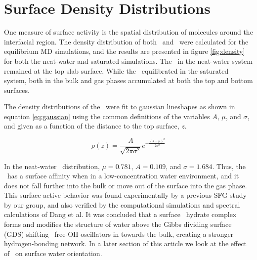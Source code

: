 \section{Surface Density Distributions}

One measure of surface activity is the spatial distribution of molecules around the interfacial region. The density distribution of both \wat~and \suldiox~were calculated for the equilibrium MD simulations, and the results are presented in figure \ref{fig:density} for both the neat-water and saturated simulations. The \suldiox~in the neat-water system remained at the top slab surface. While the \suldiox~equilibrated in the saturated system, both in the bulk and gas phases accumulated at both the top and bottom surfaces. 

The density distributions of the \suldiox~were fit to gaussian lineshapes as shown in equation \ref{eq:gaussian} using the common definitions of the variables $A$, $\mu$, and $\sigma$, and given as a function of the distance to the top surface, $z$.

\begin{equation}
  \rho(z)=\frac{A}{\sqrt{2 \pi \sigma^2}} e^{-\frac{(z-\mu)^2}{2\sigma^2}}
  \label{eq:gaussian}
\end{equation}

In the neat-water \suldiox~distribution, $\mu=0.781$, $A=0.109$, and $\sigma=1.684$\angs. Thus, the \suldiox~has a surface affinity when in a low-concentration water environment, and it does not fall further into the bulk or move out of the surface into the gas phase. This surface active behavior was found experimentally by a previous SFG study by our group,\cite{Tarbuck2005,Tarbuck2006} and also verified by the computational simulations and spectral calculations of Dang et al.\cite{Baer2010} It was concluded that a surface \suldiox~hydrate complex forms and modifies the structure of water above the Gibbs dividing surface (GDS) shifting \wat~free-OH oscillators in towards the bulk, creating a stronger hydrogen-bonding network. In a later section of this article we look at the effect of \suldiox~on surface water orientation.

